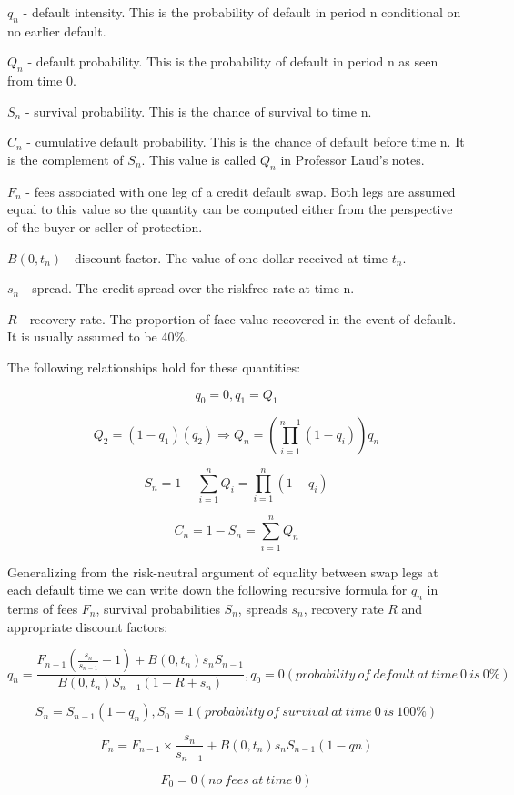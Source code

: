 $q_{n}$ - default intensity.  This is the probability of default in
period n conditional on no earlier default.

$Q_{n}$ - default probability.  This is the probability of default in
period n as seen from time 0.

$S_{n}$ - survival probability.  This is the chance of survival to
time n.

$C_{n}$ - cumulative default probability.  This is the chance of
default before time n.  It is the complement of $S_{n}$.  This value
is called $Q_{n}$ in Professor Laud's notes.

$F_{n}$ - fees associated with one leg of a credit default swap.
Both legs are assumed equal to this value so the quantity can be
computed either from the perspective of the buyer or seller of
protection.

$B(0,t_{n})$ - discount factor.  The value of one dollar received at
time $t_{n}$.

$s_{n}$ - spread.  The credit spread over the riskfree rate at
time n.

$R$ - recovery rate.  The proportion of face value recovered in
the event of default.  It is usually assumed to be 40\%.

The following relationships hold for these quantities:

$$q_{0} = 0, q_{1} = Q_{1}$$

$$Q_{2}=(1-q_{1})(q_{2}) \Rightarrow Q_{n} = (\prod_{i=1}^{n-1}(1-q_{i}))q_{n}$$

$$S_{n} = 1 - \sum_{i=1}^{n}Q_{i} = \prod_{i=1}^{n}(1 - q_{i})$$

$$C_{n} = 1 - S_{n} = \sum_{i=1}^{n}Q_{n}$$

Generalizing from the risk-neutral argument of equality between swap
legs at each default time we can write down the following recursive
formula for $q_{n}$ in terms of fees $F_{n}$, survival probabilities $S_{n}$, spreads $s_{n}$,
recovery rate $R$ and appropriate discount factors:

$$q_{n}=\frac{F_{n-1}(\frac{s_{n}}{s_{n-1}} - 1) + B(0,t_{n}) s_{n} S_{n-1}}{B(0,t_{n}) S_{n-1} (1 - R + s_{n})}, q_{0} = 0 (probability\ of\ default\ at\ time\ 0\ is\ 0\%)$$

$$S_{n}=S_{n-1} (1 - q_{n}), S_{0} = 1 (probability\ of\ survival\ at\ time\ 0\ is\ 100\%)$$

$$F_{n}=F_{n-1} \times \frac{s_{n}}{s_{n-1}} + B(0,t_{n}) s_{n} S_{n-1} (1 - q{n})$$

$$F_{0} = 0 (no\ fees\ at\ time\ 0)$$

